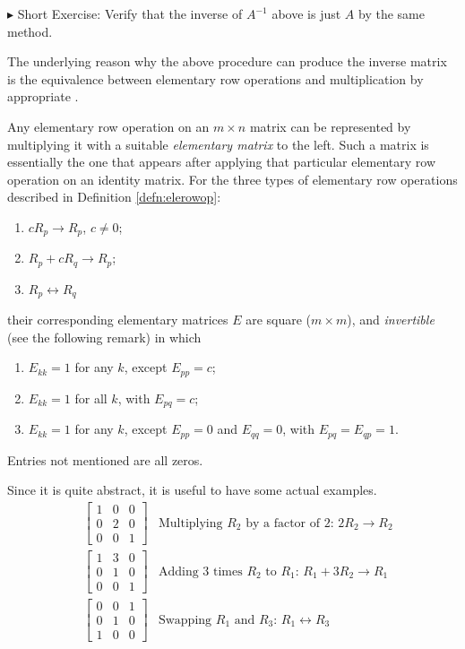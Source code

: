 $\blacktriangleright$ Short Exercise: Verify that the inverse of $A^{-1}$ above is just $A$ by the same method.\footnotemark\par
The underlying reason why the above procedure can produce the inverse matrix is the equivalence between elementary row operations and multiplication by appropriate .
\begin{defn}
\label{defn:elementarymat}
Any elementary row operation on an $m \times n$ matrix can be represented by multiplying it with a suitable \textit{elementary matrix} to the left. Such a matrix is essentially the one that appears after applying that particular elementary row operation on an identity matrix. For the three types of elementary row operations described in Definition \ref{defn:elerowop}:
\begin{enumerate}
\item $cR_{p} \to R_{p}$, $c \neq 0$;
\item $R_{p} + cR_{q} \to R_{p}$;
\item $R_{p} \leftrightarrow R_{q}$
\end{enumerate}
their corresponding elementary matrices $E$ are square ($m \times m$), and \textit{invertible} (see the following remark) in which
\begin{enumerate}
\item $E_{kk} = 1$ for any $k$, except $E_{pp} = c$;
\item $E_{kk} = 1$ for all $k$, with $E_{pq} = c$;
\item $E_{kk} = 1$ for any $k$, except $E_{pp} = 0$ and $E_{qq} = 0$, with $E_{pq} = E_{qp} = 1$. 
\end{enumerate}
Entries not mentioned are all zeros.
\end{defn}
Since it is quite abstract, it is useful to have some actual examples.
\begin{align*}
&
\begin{bmatrix}
1 & 0 & 0 \\
0 & 2 & 0 \\
0 & 0 & 1
\end{bmatrix} & \text{Multiplying $R_2$ by a factor of $2$: } 2R_2 \to R_2 \\
&
\begin{bmatrix}
1 & 3 & 0 \\
0 & 1 & 0 \\
0 & 0 & 1
\end{bmatrix} & \text{Adding 3 times $R_2$ to $R_1$: } R_1 + 3R_2 \to R_1 \\
&
\begin{bmatrix}
0 & 0 & 1 \\
0 & 1 & 0 \\
1 & 0 & 0
\end{bmatrix} & \text{Swapping $R_1$ and $R_3$: } R_1 \leftrightarrow R_3 
\end{align*}
